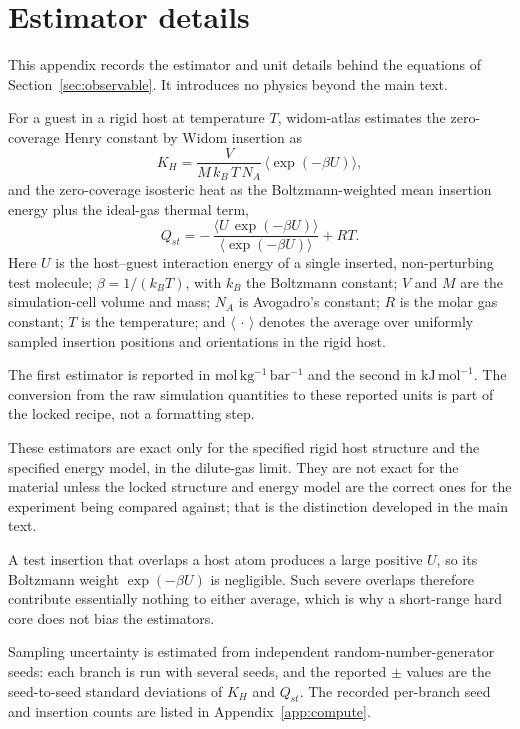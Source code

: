 \section{Estimator details}\label{app:estimator}

This appendix records the estimator and unit details behind the equations of Section~\ref{sec:observable}. It introduces no physics beyond the main text.

For a guest in a rigid host at temperature \(T\), widom-atlas estimates the zero-coverage Henry constant by Widom insertion as
\[
K_H = \frac{V}{M\,k_B\,T\,N_A}\,\bigl\langle \exp(-\beta U)\bigr\rangle,
\]
and the zero-coverage isosteric heat as the Boltzmann-weighted mean insertion energy plus the ideal-gas thermal term,
\[
Q_{st} = -\,\frac{\bigl\langle U\,\exp(-\beta U)\bigr\rangle}{\bigl\langle \exp(-\beta U)\bigr\rangle} + RT.
\]
Here \(U\) is the host--guest interaction energy of a single inserted, non-perturbing test molecule; \(\beta = 1/(k_B T)\), with \(k_B\) the Boltzmann constant; \(V\) and \(M\) are the simulation-cell volume and mass; \(N_A\) is Avogadro's constant; \(R\) is the molar gas constant; \(T\) is the temperature; and \(\langle\,\cdot\,\rangle\) denotes the average over uniformly sampled insertion positions and orientations in the rigid host.

The first estimator is reported in \(\mathrm{mol\,kg^{-1}\,bar^{-1}}\) and the second in \(\mathrm{kJ\,mol^{-1}}\). The conversion from the raw simulation quantities to these reported units is part of the locked recipe, not a formatting step.

These estimators are exact only for the specified rigid host structure and the specified energy model, in the dilute-gas limit. They are not exact for the material unless the locked structure and energy model are the correct ones for the experiment being compared against; that is the distinction developed in the main text.

A test insertion that overlaps a host atom produces a large positive \(U\), so its Boltzmann weight \(\exp(-\beta U)\) is negligible. Such severe overlaps therefore contribute essentially nothing to either average, which is why a short-range hard core does not bias the estimators.

Sampling uncertainty is estimated from independent random-number-generator seeds: each branch is run with several seeds, and the reported \(\pm\) values are the seed-to-seed standard deviations of \(K_H\) and \(Q_{st}\). The recorded per-branch seed and insertion counts are listed in Appendix~\ref{app:compute}.
